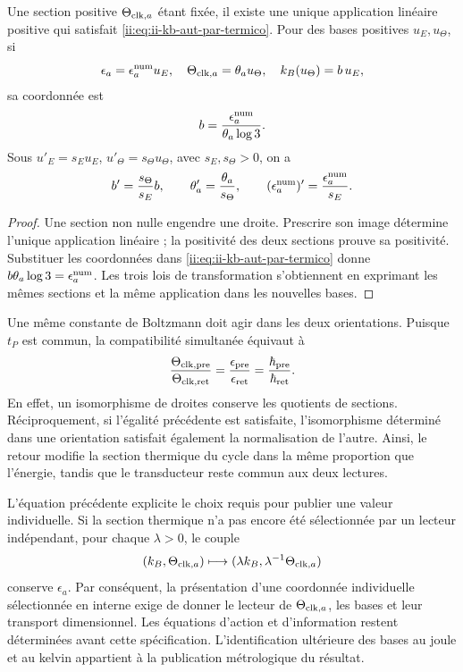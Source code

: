 \begin{theorem}
Une section positive \(\Theta_{{\rm clk},a}\) étant fixée, il existe une unique application linéaire positive qui satisfait \eqref{ii:eq:ii-kb-aut-par-termico}. Pour des bases positives \(u_E,u_\Theta\), si
\[
 \epsilon_a=\epsilon_a^{\rm num}u_E,\quad
 \Theta_{{\rm clk},a}=\theta_a u_\Theta,\quad
 k_B(u_\Theta)=b\,u_E,
\]
sa coordonnée est
\begin{equation}
 b=\frac{\epsilon_a^{\rm num}}{\theta_a\log3}.
 \label{ii:eq:ii-kb-aut-coordenada}
\end{equation}
Sous \(u'_E=s_Eu_E\), \(u'_\Theta=s_\Theta u_\Theta\), avec
\(s_E,s_\Theta>0\), on a
\[
 b'=\frac{s_\Theta}{s_E}b,\qquad
 \theta'_a=\frac{\theta_a}{s_\Theta},\qquad
 (\epsilon_a^{\rm num})'=\frac{\epsilon_a^{\rm num}}{s_E}.
\]
\end{theorem}
\begin{proof}
Une section non nulle engendre une droite. Prescrire son image détermine
l'unique application linéaire ; la positivité des deux sections prouve
sa positivité. Substituer les coordonnées dans
\eqref{ii:eq:ii-kb-aut-par-termico} donne
\(b\theta_a\log3=\epsilon_a^{\rm num}\). Les trois lois de
transformation s'obtiennent en exprimant les mêmes sections et la même
application dans les nouvelles bases.
\end{proof}

Une même constante de Boltzmann doit agir dans les deux orientations.
Puisque \(t_P\) est commun, la compatibilité simultanée équivaut à
\begin{equation}
 \frac{\Theta_{{\rm clk},{\rm pre}}}{\Theta_{{\rm clk},{\rm ret}}}
 =\frac{\epsilon_{\rm pre}}{\epsilon_{\rm ret}}
 =\frac{\hbar_{\rm pre}}{\hbar_{\rm ret}}.
 \label{ii:eq:ii-kb-aut-orientaciones}
\end{equation}
En effet, un isomorphisme de droites conserve les quotients de sections. Réciproquement, si l'égalité précédente est satisfaite, l'isomorphisme déterminé dans une orientation satisfait également la normalisation de l'autre. Ainsi, le retour modifie la section thermique du cycle dans la même proportion que l'énergie, tandis que le transducteur reste commun aux deux lectures.

L'équation précédente explicite le choix requis pour publier une
valeur individuelle. Si la section thermique n'a pas encore été sélectionnée
par un lecteur indépendant, pour chaque \(\lambda>0\), le couple
\[
 (k_B,\Theta_{{\rm clk},a})
 \longmapsto(\lambda k_B,\lambda^{-1}\Theta_{{\rm clk},a})
\]
conserve \(\epsilon_a\). Par conséquent, la présentation d'une
coordonnée individuelle sélectionnée en interne exige de donner le lecteur de
\(\Theta_{{\rm clk},a}\), les bases et leur transport dimensionnel.
Les équations d'action et d'information restent déterminées avant
cette spécification. L'identification ultérieure des bases au
joule et au kelvin appartient à la publication métrologique du résultat.


